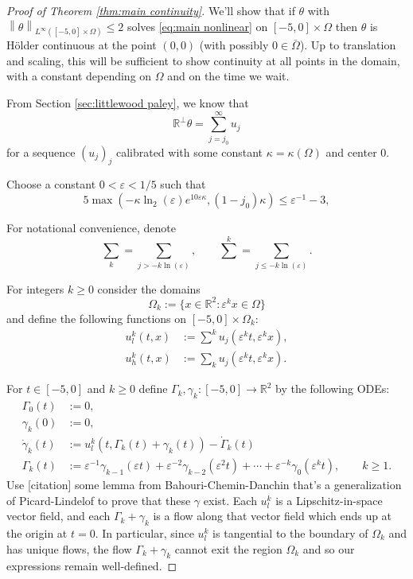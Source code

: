 \documentclass[11pt]{amsart}
\theoremstyle{remark}
\theoremstyle{definition}
\newcommand{\R}{\mathbb{R}}
\newcommand{\eps}{\varepsilon}
\newcommand{\norm}[1]{\left\lVert#1\right\rVert}
\newcommand{\paren}[1]{\left( #1 \right)}
\newcommand{\n}{^{-1}}
\newcommand{\ulow}{u_l}
\newcommand{\uhigh}{u_h}
\newcommand{\ulowth}[1]{\ulow^{#1}}
\newcommand{\uhighth}[1]{\uhigh^{#1}}
\begin{document}
\begin{proof}[Proof of Theorem \ref{thm:main continuity}]
We'll show that if $\theta$ with $\norm{\theta}_{L^\infty([-5,0] \times \Omega)} \leq 2$ solves \eqref{eq:main nonlinear} on $[-5,0]\times \Omega$ then $\theta$ is H\"{o}lder continuous at the point $(0,0)$ (with possibly $0 \in \bar{\Omega}$).  Up to translation and scaling, this will be sufficient to show continuity at all points in the domain, with a constant depending on $\Omega$ and on the time we wait.  

From Section \ref{sec:littlewood paley}, we know that 
\[ \R^\perp \theta = \sum_{j=j_0}^\infty u_j \]
for a sequence $(u_j)_j$ calibrated with some constant $\kappa = \kappa(\Omega)$ and center 0.  

Choose a constant $0 < \eps < 1/5$ such that
\begin{equation}\label{eps is small enough for Cgamma} 
5 \max\paren{ - \kappa \ln_2(\eps) e^{10\eps\kappa}, (1-j_0) \kappa} \leq \eps\n - 3,
\end{equation}


For notational convenience, denote
\[ \sum_k = \sum_{j > - k \ln(\eps)}, \qquad \sum^k = \sum_{j \leq -k \ln(\eps)}. \]

For integers $k \geq 0$ consider the domains
\[ \Omega_k := \{x \in \R^2: \eps^k x \in \Omega\} \]
and define the following functions on $[-5,0]\times \Omega_k$:
\begin{align*} 
\ulowth{k}(t,x) &:= \sum^k u_j(\eps^k t, \eps^k x), \\
\uhighth{k}(t,x) &:= \sum_k u_j(\eps^k t, \eps^k x).  
\end{align*}

For $t \in [-5,0]$ and $k \geq 0$ define $\Gamma_k, \gamma_k: [-5,0] \to \R^2$ by the following ODEs:
\begin{align*}
\Gamma_0(t) &:= 0, \\
\gamma_k(0) &:= 0, \\
\dot{\gamma}_k(t) &:= \ulowth{k}(t, \Gamma_k(t) + \gamma_k(t)) - \dot{\Gamma}_k(t) \\
\Gamma_k(t) &:= \eps\n \gamma_{k-1}(\eps t) + \eps^{-2} \gamma_{k-2}(\eps^2 t) + \cdots + \eps^{-k} \gamma_0(\eps^k t), \qquad k \geq 1.
\end{align*}
Use [citation] some lemma from Bahouri-Chemin-Danchin that's a generalization of Picard-Lindelof to prove that these $\gamma$ exist.  Each $\ulowth{k}$ is a Lipschitz-in-space vector field, and each $\Gamma_k + \gamma_k$ is a flow along that vector field which ends up at the origin at $t=0$.  In particular, since  $\ulowth{k}$ is tangential to the boundary of $\Omega_k$ and has unique flows, the flow $\Gamma_k + \gamma_k$ cannot exit the region $\Omega_k$ and so our expressions remain well-defined.  


\end{proof}
\end{document}
